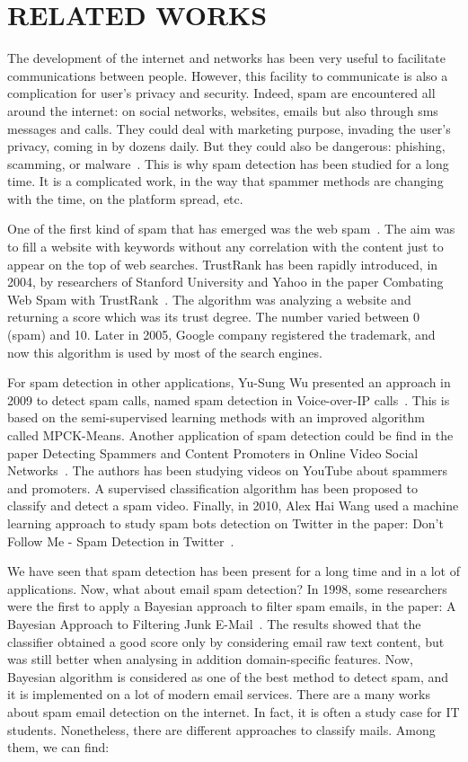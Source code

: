 \documentclass[runningheads]{llncs}
\begin{document}
\section{RELATED WORKS}
%
The development of the internet and networks has been very useful to facilitate communications between people. However, this facility to communicate is also a complication for user's privacy and security. Indeed, spam are encountered all around the internet: on social networks, websites, emails but also through sms messages and calls. They could deal with marketing purpose, invading the user's privacy, coming in by dozens daily. But they could also be dangerous: phishing, scamming, or malware~\cite{ref8}. This is why spam detection has been studied for a long time. It is a complicated work, in the way that spammer methods are changing with the time, on the platform spread, etc. \\\par
One of the first kind of spam that has emerged was the web spam~\cite{ref7}. The aim was to fill a website with keywords without any correlation with the content just to appear on the top of web searches. TrustRank has been rapidly introduced, in 2004, by researchers of Stanford University and Yahoo in the paper Combating Web Spam with TrustRank~\cite{ref13}. The algorithm was analyzing a website and returning a score which was its trust degree. The number varied between 0 (spam) and 10. Later in 2005, Google company registered the trademark, and now this algorithm is used by most of the search engines. \\\par
For spam detection in other applications, Yu-Sung Wu presented an approach in 2009 to detect spam calls, named spam detection in Voice-over-IP calls~\cite{ref9}. This is based on the semi-supervised learning methods with an improved algorithm called MPCK-Means. Another application of spam detection could be find in the paper Detecting Spammers and Content Promoters in Online Video Social Networks~\cite{ref10}. The authors has been studying videos on YouTube about spammers and promoters. A supervised classification algorithm has been proposed to classify and detect a spam video. Finally, in 2010, Alex Hai Wang used a machine learning approach to study spam bots detection on Twitter in the paper: Don't Follow Me - Spam Detection in Twitter~\cite{ref12}. \\\par
We have seen that spam detection has been present for a long time and in a lot of applications. Now, what about email spam detection? In 1998, some researchers were the first to apply a Bayesian approach to filter spam emails, in the paper: A Bayesian Approach to Filtering Junk E-Mail~\cite{ref11}. The results showed that the classifier obtained a good score only by considering email raw text content, but was still better when analysing in addition domain-specific features. Now, Bayesian algorithm is considered as one of the best method to detect spam, and it is implemented on a lot of modern email services. There are a many works about spam email detection on the internet. In fact, it is often a study case for IT students. Nonetheless, there are different approaches to classify mails. Among them, we can find:
\end{document}
